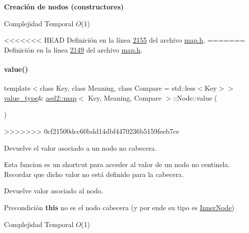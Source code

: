 \begin{Indent}{\bf \-Creación de nodos (constructores)}
\begin{DoxyDescription}
\item[Complejidad Temporal]$O$(1)
\end{DoxyDescription}

<<<<<<< HEAD
\-Definición en la línea \hyperlink{map_8h_source_l02155}{2155} del archivo \hyperlink{map_8h_source}{map.\-h}.
=======
Definición en la línea \hyperlink{map_8h_source_l02149}{2149} del archivo \hyperlink{map_8h_source}{map.\+h}.

\mbox{\label{structaed2_1_1map_1_1Node_af4ada8e79dabb4849fc87de63d3970fb_af4ada8e79dabb4849fc87de63d3970fb}} 
\paragraph{\texorpdfstring{value()}{value()}\hspace{0.1cm}{\footnotesize\ttfamily [1/2]}}
{\footnotesize\ttfamily template$<$class Key, class Meaning, class Compare = std\+::less$<$\+Key$>$$>$ \\
\hyperlink{classaed2_1_1map_a719db98e0ff9a837610f76be33264680_a719db98e0ff9a837610f76be33264680}{value\+\_\+type}\& \hyperlink{classaed2_1_1map}{aed2\+::map}$<$ Key, Meaning, Compare $>$\+::Node\+::value (\begin{DoxyParamCaption}{ }\end{DoxyParamCaption})\hspace{0.3cm}{\ttfamily [inline]}}
>>>>>>> 0cf21500dcc60bdd14dbf4470236b5159feeb7ce



Devuelve el valor asociado a un nodo no cabecera. 

Esta funcion es un shortcut para acceder al valor de un nodo no centinela. Recordar que dicho valor no está definido para la cabecera.

\begin{DoxyReturn}{Devuelve}
valor asociado al nodo.
\end{DoxyReturn}
\begin{DoxyPrecond}{Precondición}
{\bfseries this} no es el nodo cabecera (y por ende su tipo es \hyperlink{structaed2_1_1map_1_1InnerNode}{Inner\+Node})
\end{DoxyPrecond}

\begin{DoxyDescription}
\item[Complejidad Temporal]$O$(1)
\end{DoxyDescription}


\end{Indent}
